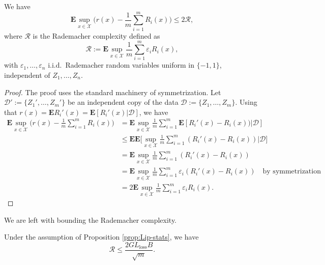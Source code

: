\begin{proposition}
\label{prop:radamacher}
We have
$$
	\mathbf{E}\sup_{x\in\mathcal{X}} \bigg( r(x) - \frac{1}{m}\sum_{i=1}^m R_i(x) \bigg)
	\le 
	2 \mathcal{R},
$$
where $\mathcal{R}$ is the Rademacher complexity defined as
$$
	\mathcal{R}:=\mathbf{E} \sup_{x\in\mathcal{X}} \frac{1}{m}\sum_{i=1}^m\varepsilon_i R_i(x) ,
$$
with $\varepsilon_1,\ldots,\varepsilon_n$ i.i.d.\ Rademacher random variables uniform in $\{-1,1\}$, independent of $Z_1,\ldots,Z_n$. 
\end{proposition}

\begin{proof}
The proof uses the standard machinery of symmetrization. Let $\mathcal{D}':=\{Z_1',\ldots,Z_m'\}$ be an independent copy of the data $\mathcal{D}:=\{Z_1,\ldots,Z_m\}$. Using that $r(x)=\mathbf{E}R_i'(x)=\mathbf{E}[R_i'(x)|\mathcal{D}]$, we have
\begin{align*}
	\mathbf{E}\sup_{x\in\mathcal{X}} \bigg( r(x) - \frac{1}{m}\sum_{i=1}^m R_i(x) \bigg)
	&=
	\mathbf{E}\sup_{x\in\mathcal{X}} \frac{1}{m}\sum_{i=1}^m \mathbf{E} [ R_i'(x) - R_i(x) ) | \mathcal{D}]\\
	&\le
	\mathbf{E}\mathbf{E}\bigg[\sup_{x\in\mathcal{X}} \frac{1}{m}\sum_{i=1}^m ( R_i'(x) - R_i(x)) \bigg| \mathcal{D}\bigg]\\
	&=
	\mathbf{E}\sup_{x\in\mathcal{X}} \frac{1}{m}\sum_{i=1}^m ( R_i'(x) - R_i(x) )\\
	&=
	\mathbf{E}\sup_{x\in\mathcal{X}} \frac{1}{m}\sum_{i=1}^m \varepsilon_i (R_i'(x) - R_i(x)) \quad \text{by symmetrization}\\
	&=
	2\mathbf{E}\sup_{x\in\mathcal{X}} \frac{1}{m}\sum_{i=1}^m \varepsilon_i R_i(x).
\end{align*}
\end{proof}

We are left with bounding the Rademacher complexity.
\begin{proposition}
\label{prop:boundonradamacher}
Under the assumption of Proposition \ref{prop:Lip-stats}, we have
$$
	\mathcal{R}
	\le
	\frac{2GL_\textrm{loss}B}{\sqrt{m}}.
$$
\end{proposition}

